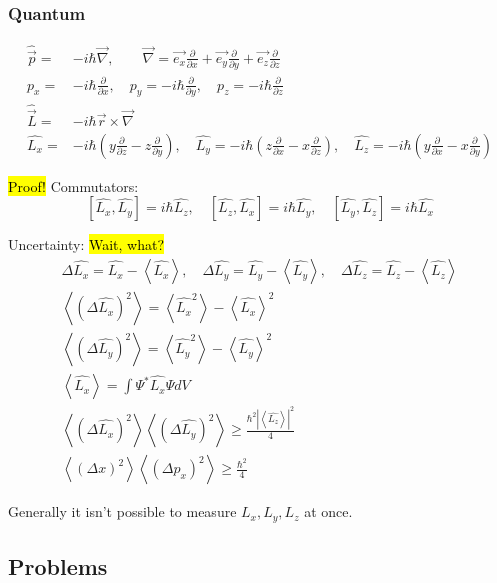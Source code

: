 		\subsubsection{Quantum}
			\begin{align}
				\hat{\vec{p}} =& -i\hbar\vec{\nabla}, \qquad \vec{\nabla} = \vec{e_x}\frac{\partial}{\partial x} + \vec{e_y}\frac{\partial}{\partial y} + \vec{e_z}\frac{\partial}{\partial z} \\
				p_x =& -i\hbar \frac{\partial}{\partial x}, \quad p_y = -i\hbar \frac{\partial}{\partial y}, \quad p_z = -i\hbar \frac{\partial}{\partial z} \\
				\hat{\vec{L}} =& -i\hbar\vec{r}\times\vec{\nabla} \\
				\hat{L_x} =& -i\hbar(y\frac{\partial}{\partial z} - z\frac{\partial}{\partial y}), \quad \hat{L_y} = -i\hbar(z\frac{\partial}{\partial x} - x\frac{\partial}{\partial z}), \quad \hat{L_z} = -i\hbar(y\frac{\partial}{\partial x} - x\frac{\partial}{\partial y}) 
			\end{align}
			
			\hl{Proof!} Commutators:
			\begin{equation}
				\left[\hat{L_x}, \hat{L_y}\right] = i\hbar\hat{L_z}, \quad
				\left[\hat{L_z}, \hat{L_x}\right] = i\hbar\hat{L_y}, \quad
				\left[\hat{L_y}, \hat{L_z}\right] = i\hbar\hat{L_x}
			\end{equation}
			
			Uncertainty: \hl{Wait, what?}
			\begin{align}
				\Delta \hat{L_x} = \hat{L_x} - \left<\hat{L_x} \right>, \quad
				\Delta \hat{L_y} = \hat{L_y} - \left<\hat{L_y} \right>, \quad
				\Delta \hat{L_z} = \hat{L_z} - \left<\hat{L_z} \right> \\
				\left<(\Delta\hat{L_x})^2 \right> = \left<\hat{L_x}^2 \right> - \left<\hat{L_x} \right>^2 \\
				\left<(\Delta\hat{L_y})^2 \right> = \left<\hat{L_y}^2 \right> - \left<\hat{L_y} \right>^2 \\
				\left<\hat{L_x} \right> = \int \Psi^* \hat{L_x} \Psi dV \\ 
				\left<(\Delta\hat{L_x})^2 \right>\left<(\Delta\hat{L_y})^2 \right> \geq \frac{\hbar^2|\left<\hat{L_z}\right>|^2}{4} \\
				\left<(\Delta x)^2 \right>\left<(\Delta p_x)^2 \right> \geq \frac{\hbar^2}{4} \nonumber				
			\end{align}
			
			Generally it isn't possible to measure $L_x, L_y, L_z$ at once. 
		
	\subsection{Problems}
